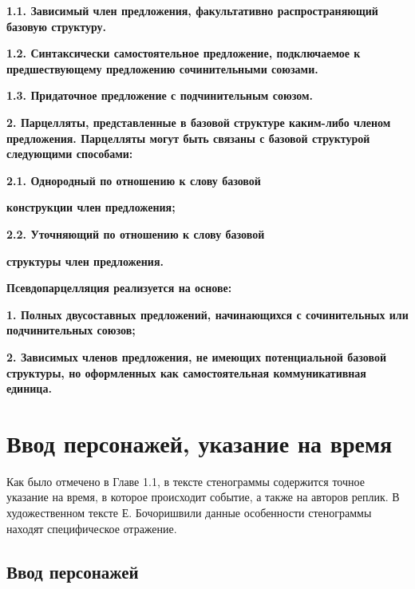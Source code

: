 \documentclass{kursa4}
\begin{document}
      {\bfseries\color[rgb]{0.2,0.2,0.2}
      \textmd{1.1. Зависимый член предложения, факультативно распространяющий базовую структуру.}}

      {\bfseries\color[rgb]{0.2,0.2,0.2}
      \textmd{1.2. }\textmd{Синтаксически самостоятельное предложение, подключаемое к предшествующему предложению сочинительными союзами.}}

      {\bfseries\color[rgb]{0.2,0.2,0.2}
      \textmd{1.3. Придаточное предложение с подчинительным союзом.}}

      {\bfseries\color[rgb]{0.2,0.2,0.2}
      \textmd{2. Парцелляты, представленные в базовой структуре каким-либо членом предложения. Парцелляты могут быть связаны с базовой структурой следующими способами:}}

      {\bfseries\color[rgb]{0.2,0.2,0.2}
      \textmd{2.1. Однородный по отношению к слову базовой}}

      {\bfseries\color[rgb]{0.2,0.2,0.2}
      \textmd{конструкции член предложения;}}

      {\bfseries\color[rgb]{0.2,0.2,0.2}
      \textmd{2.2. Уточняющий по отношению к слову базовой}}

      {\bfseries\color[rgb]{0.2,0.2,0.2}
      \textmd{структуры член предложения.}}

      {\bfseries\color[rgb]{0.2,0.2,0.2}
      \textmd{}Псевдопарцелляция\textmd{ реализуется на основе:}}

      {\bfseries\color[rgb]{0.2,0.2,0.2}
      \textmd{1. }\textmd{Полных двусоставных п}\textmd{редложений, начинающихся с сочинительных или подчинительных союзов;}}

      {\bfseries\color[rgb]{0.2,0.2,0.2}
      \textmd{2. }\textmd{Зависимых членов предложения, }\textmd{не имеющих потенциальной базовой структуры, }\textmd{но оформленных как самостоятельная коммуникативная единица. }}




    \section{Ввод персонажей, указание на время}   
      Как было отмечено в Главе 1.1, в тексте стенограммы содержится точное указание на время, в которое происходит событие, а также на авторов реплик. В художественном тексте Е. Бочоришвили данные особенности стенограммы находят специфическое отражение. 

      \subsection{Ввод персонажей}
\end{document}
